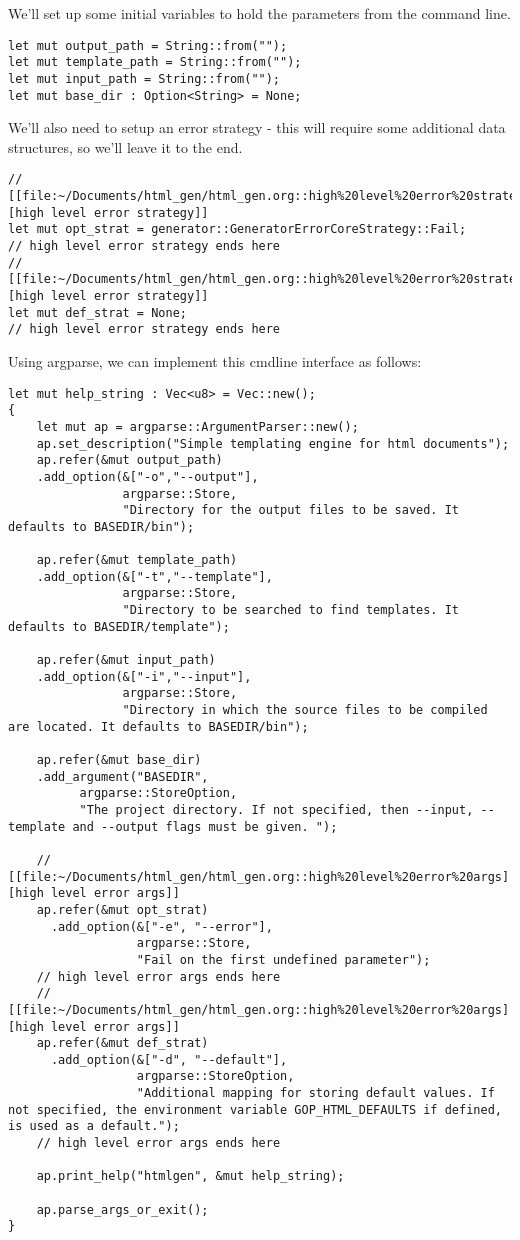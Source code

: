 \documentclass[11pt]{article}
\begin{document}
We'll set up some initial variables to hold the parameters from the command line.
\begin{verbatim}
let mut output_path = String::from("");
let mut template_path = String::from("");
let mut input_path = String::from("");
let mut base_dir : Option<String> = None;
\end{verbatim}

We'll also need to setup an error strategy - this will require some additional data structures, so we'll leave it to the end.
\begin{verbatim}
// [[file:~/Documents/html_gen/html_gen.org::high%20level%20error%20strategy][high level error strategy]]
let mut opt_strat = generator::GeneratorErrorCoreStrategy::Fail;
// high level error strategy ends here
// [[file:~/Documents/html_gen/html_gen.org::high%20level%20error%20strategy][high level error strategy]]
let mut def_strat = None;
// high level error strategy ends here
\end{verbatim}



Using argparse, we can implement this cmdline interface as follows:
\begin{verbatim}
let mut help_string : Vec<u8> = Vec::new();
{
    let mut ap = argparse::ArgumentParser::new();
    ap.set_description("Simple templating engine for html documents");
    ap.refer(&mut output_path)
    .add_option(&["-o","--output"], 
                argparse::Store, 
                "Directory for the output files to be saved. It defaults to BASEDIR/bin");

    ap.refer(&mut template_path)
    .add_option(&["-t","--template"], 
                argparse::Store, 
                "Directory to be searched to find templates. It defaults to BASEDIR/template");

    ap.refer(&mut input_path)
    .add_option(&["-i","--input"], 
                argparse::Store, 
                "Directory in which the source files to be compiled are located. It defaults to BASEDIR/bin");

    ap.refer(&mut base_dir)
    .add_argument("BASEDIR", 
          argparse::StoreOption, 
          "The project directory. If not specified, then --input, --template and --output flags must be given. ");

    // [[file:~/Documents/html_gen/html_gen.org::high%20level%20error%20args][high level error args]]
    ap.refer(&mut opt_strat)
      .add_option(&["-e", "--error"],
                  argparse::Store,
                  "Fail on the first undefined parameter");
    // high level error args ends here
    // [[file:~/Documents/html_gen/html_gen.org::high%20level%20error%20args][high level error args]]
    ap.refer(&mut def_strat)
      .add_option(&["-d", "--default"],
                  argparse::StoreOption,
                  "Additional mapping for storing default values. If not specified, the environment variable GOP_HTML_DEFAULTS if defined, is used as a default.");
    // high level error args ends here

    ap.print_help("htmlgen", &mut help_string);

    ap.parse_args_or_exit();
}
\end{verbatim}
\end{document}
